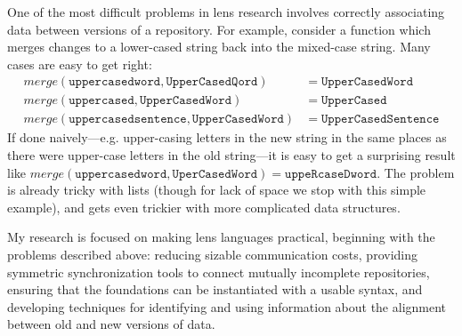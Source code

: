 \documentclass{article}
\begin{document}
One of the most difficult problems in lens research involves correctly
associating data between versions of a repository. For example, consider a
function which merges changes to a lower-cased string back into
the mixed-case string. Many cases are easy to get right:
\begin{align*}
    \mathit{merge}(\mathtt{uppercasedword},\mathtt{UpperCasedQord})
        &= \mathtt{UpperCasedWord} \\
    \mathit{merge}(\mathtt{uppercased},\mathtt{UpperCasedWord})
        &= \mathtt{UpperCased} \\
    \mathit{merge}(\mathtt{uppercasedsentence},\mathtt{UpperCasedWord})
        &= \mathtt{UpperCasedSentence}
\end{align*}
If done naively---e.g. upper-casing letters in the new string in the same
places as there were upper-case letters in the old string---it is easy to
get a surprising result like $\mathit{merge}(\mathtt{uppercasedword},
\mathtt{UperCasedWord}) = \mathtt{uppeRcaseDword}$.  The problem is already
tricky with lists (though for lack of space we stop with this simple
example), and gets even trickier with more complicated data structures.

My research is focused on making lens languages practical, beginning with
the problems described above: reducing sizable communication costs,
providing symmetric synchronization tools to connect mutually incomplete
repositories, ensuring that the foundations can be instantiated with a
usable syntax, and developing techniques for identifying and using
information about the alignment between old and new versions of data.
\end{document}
